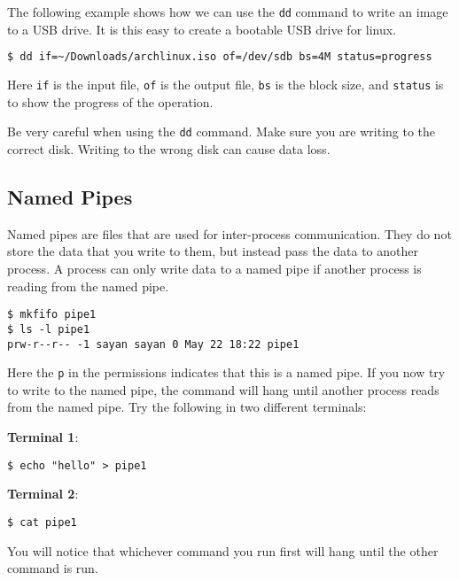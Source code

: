 The following example shows how we can use the \lstinline|dd| command to write an image
to a USB drive.
It is this easy to create a bootable USB drive for linux.

\begin{lstlisting}[language=bash]
  $ dd if=~/Downloads/archlinux.iso of=/dev/sdb bs=4M status=progress
\end{lstlisting}

Here \lstinline|if| is the input file, \lstinline|of| is the output file, \lstinline|bs| is the block size, and \lstinline|status| is to show the progress of the operation.

\begin{warn}
  Be very careful when using the \lstinline|dd| command.
  Make sure you are writing to the correct disk.
  Writing to the wrong disk can cause data loss.
\end{warn}


\subsection{Named Pipes}

Named pipes
are files that are used for inter-process communication.
They do not store the data that you write to them, but instead pass the data to another process.
A process can only write data to a named pipe if another process is reading from the named pipe.

\begin{lstlisting}
$ mkfifo pipe1
$ ls -l pipe1
prw-r--r-- -1 sayan sayan 0 May 22 18:22 pipe1
\end{lstlisting}

Here the \lstinline|p| in the permissions indicates that this is a named pipe.
If you now try to write to the named pipe, the command will hang until another process reads from the named pipe.
Try the following in two different terminals:

\textbf{Terminal 1}:
\begin{lstlisting}
$ echo "hello" > pipe1
\end{lstlisting}

\textbf{Terminal 2}:
\begin{lstlisting}
$ cat pipe1
\end{lstlisting}

You will notice that whichever command you run first will hang until the other command is run.

